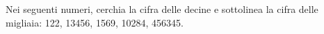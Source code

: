 \item Nei seguenti numeri, cerchia la cifra delle decine e sottolinea la cifra delle migliaia: 122, 13456, 1569, 10284, 456345. 